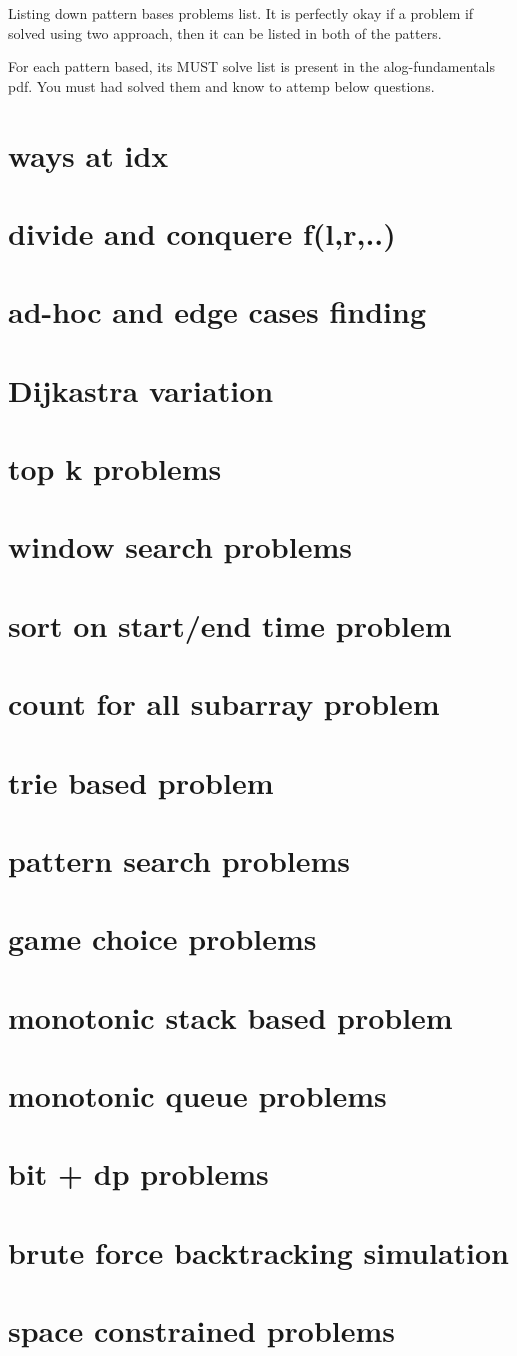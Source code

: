 
Listing down pattern bases problems list.
It is perfectly okay if a problem if solved using two approach, then it can be listed in both of the patters.

For each pattern based, its MUST solve list is present in the alog-fundamentals pdf. You must had solved them and know to attemp below questions.

\setcounter{chapter}{0}
\chapter{ways at idx}
\chapter{divide and conquere f(l,r,..)}
\chapter{ad-hoc and edge cases finding}
\chapter{Dijkastra variation}
\chapter{top k problems}
\chapter{window search problems}
\chapter{sort on start/end time problem}
\chapter{count for all subarray problem}
\chapter{trie based problem}
\chapter{pattern search problems}
\chapter{game choice problems}

\chapter{monotonic stack based problem}
\chapter{monotonic queue problems}
\chapter{bit + dp problems}
\chapter{brute force backtracking simulation}
\chapter{space constrained problems}

